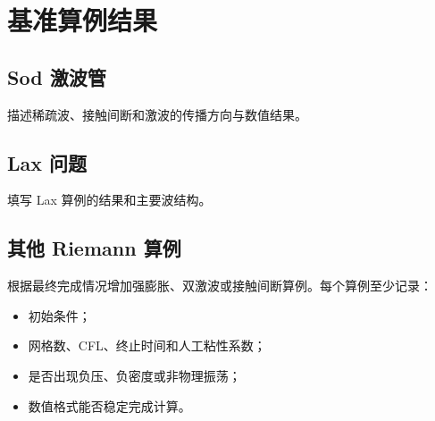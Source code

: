 \section{基准算例结果}

\subsection{Sod 激波管}

描述稀疏波、接触间断和激波的传播方向与数值结果。


\subsection{Lax 问题}

填写 Lax 算例的结果和主要波结构。


\subsection{其他 Riemann 算例}

根据最终完成情况增加强膨胀、双激波或接触间断算例。每个算例至少记录：

\begin{itemize}[leftmargin=2em]
    \item 初始条件；
    \item 网格数、CFL、终止时间和人工粘性系数；
    \item 是否出现负压、负密度或非物理振荡；
    \item 数值格式能否稳定完成计算。
\end{itemize}
